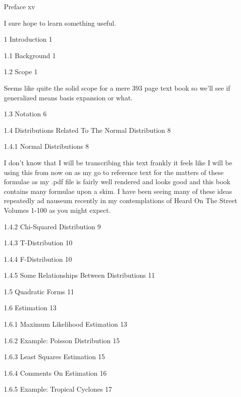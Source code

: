 \twocolumn

Preface xv

I sure hope to learn something useful.

1 Introduction 1



1.1 Background 1



1.2 Scope 1

Seems like quite the solid scope for a mere $393$ page text book so we'll see if generalized means basis expansion or what.

1.3 Notation 6



1.4 Distributions Related To The Normal Distribution 8



1.4.1 Normal Distributions 8

I don't know that I will be transcribing this text frankly it feels like I will be using this from now on as my go to reference text for the matters of these formulae as my .pdf file is fairly well rendered and looks good and this book contains many formulae upon a skim. I have been seeing many of these ideas repeatedly ad nauseum recently in my contemplations of Heard On The Street Volumes 1-100 as you might expect.

1.4.2 Chi-Squared Distribution 9



1.4.3 T-Distribution 10



1.4.4 F-Distribution 10



1.4.5 Some Relationships Between Distributions 11



1.5 Quadratic Forms 11



1.6 Estimation 13



1.6.1 Maximum Likelihood Estimation 13



1.6.2 Example: Poisson Distribution 15



1.6.3 Least Squares Estimation 15



1.6.4 Comments On Estimation 16



1.6.5 Example: Tropical Cyclones 17



